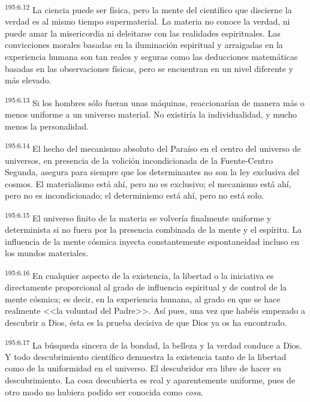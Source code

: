 \par 
\textsuperscript{195:6.12} La ciencia puede ser física, pero la mente del científico que discierne la verdad es al mismo tiempo supermaterial. La materia no conoce la verdad, ni puede amar la misericordia ni deleitarse con las realidades espirituales. Las convicciones morales basadas en la iluminación espiritual y arraigadas en la experiencia humana son tan reales y seguras como las deducciones matemáticas basadas en las observaciones físicas, pero se encuentran en un nivel diferente y más elevado.

\par 
\textsuperscript{195:6.13} Si los hombres sólo fueran unas máquinas, reaccionarían de manera más o menos uniforme a un universo material. No existiría la individualidad, y mucho menos la personalidad.

\par 
\textsuperscript{195:6.14} El hecho del mecanismo absoluto del Paraíso en el centro del universo de universos, en presencia de la volición incondicionada de la Fuente-Centro Segunda, asegura para siempre que los determinantes no son la ley exclusiva del cosmos. El materialismo está ahí, pero no es exclusivo; el mecanismo está ahí, pero no es incondicionado; el determinismo está ahí, pero no está solo.

\par 
\textsuperscript{195:6.15} El universo finito de la materia se volvería finalmente uniforme y determinista si no fuera por la presencia combinada de la mente y el espíritu. La influencia de la mente cósmica inyecta constantemente espontaneidad incluso en los mundos materiales.

\par 
\textsuperscript{195:6.16} En cualquier aspecto de la existencia, la libertad o la iniciativa es directamente proporcional al grado de influencia espiritual y de control de la mente cósmica; es decir, en la experiencia humana, al grado en que se hace realmente <<la voluntad del Padre>>. Así pues, una vez que habéis empezado a descubrir a Dios, ésta es la prueba decisiva de que Dios ya os ha encontrado.

\par 
\textsuperscript{195:6.17} La búsqueda sincera de la bondad, la belleza y la verdad conduce a Dios. Y todo descubrimiento científico demuestra la existencia tanto de la libertad como de la uniformidad en el universo. El descubridor era libre de hacer su descubrimiento. La cosa descubierta es real y aparentemente uniforme, pues de otro modo no hubiera podido ser conocida como \textit{cosa}.

